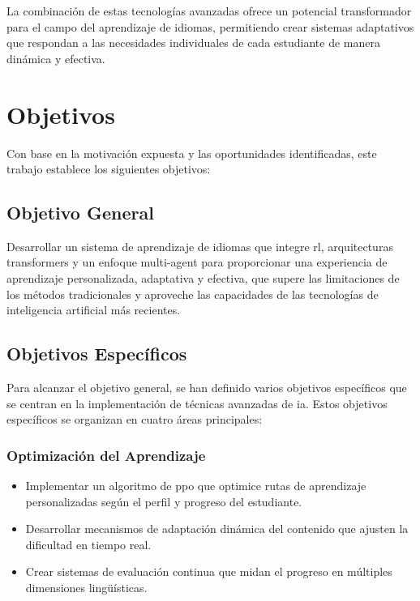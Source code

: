 La combinación de estas tecnologías avanzadas ofrece un potencial transformador para el campo del aprendizaje de idiomas, permitiendo crear sistemas adaptativos que respondan a las necesidades individuales de cada estudiante de manera dinámica y efectiva.

\section{Objetivos}
\label{sec:objetivos}

Con base en la motivación expuesta y las oportunidades identificadas, este trabajo establece los siguientes objetivos:

\subsection{Objetivo General}
\label{subsec:objetivo-general}

Desarrollar un sistema de aprendizaje de idiomas que integre \gls{rl}, arquitecturas \gls{transformers} y un enfoque \gls{multi-agent} para proporcionar una experiencia de aprendizaje personalizada, adaptativa y efectiva, que supere las limitaciones de los métodos tradicionales y aproveche las capacidades de las tecnologías de inteligencia artificial más recientes.

\subsection{Objetivos Específicos}
\label{subsec:objetivos-especificos}

Para alcanzar el objetivo general, se han definido varios objetivos específicos que se centran en la implementación de técnicas avanzadas de \gls{ia}. Estos objetivos específicos se organizan en cuatro áreas principales:

\subsubsection{Optimización del Aprendizaje}
\label{subsubsec:optimizacion-aprendizaje}

\begin{itemize}
  \item Implementar un algoritmo de \gls{ppo} que optimice rutas de aprendizaje personalizadas según el perfil y progreso del estudiante.
  \item Desarrollar mecanismos de adaptación dinámica del contenido que ajusten la dificultad en tiempo real.
  \item Crear sistemas de evaluación continua que midan el progreso en múltiples dimensiones lingüísticas.
\end{itemize}

